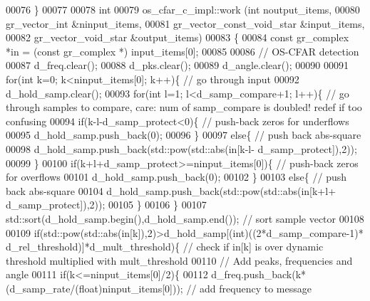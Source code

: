 \begin{DoxyCode}
00076     \}
00077 
00078     \textcolor{keywordtype}{int}
00079     os_cfar_c_impl::work (\textcolor{keywordtype}{int} noutput\_items,
00080                        gr\_vector\_int &ninput\_items,
00081                        gr\_vector\_const\_void\_star &input\_items,
00082                        gr\_vector\_void\_star &output\_items)
00083     \{
00084         \textcolor{keyword}{const} gr\_complex *in = (\textcolor{keyword}{const} gr\_complex *) input\_items[0];
00085         
00086         \textcolor{comment}{// OS-CFAR detection}
00087         d_freq.clear();
00088         d_pks.clear();
00089         d_angle.clear();
00090         
00091         \textcolor{keywordflow}{for}(\textcolor{keywordtype}{int} k=0; k<ninput\_items[0]; k++)\{ \textcolor{comment}{// go through input}
00092             d_hold_samp.clear();
00093             \textcolor{keywordflow}{for}(\textcolor{keywordtype}{int} l=1; l<d_samp_compare+1; l++)\{ \textcolor{comment}{// go through samples to compare, care: num of
       samp\_compare is doubled! redef if too confusing}
00094                 \textcolor{keywordflow}{if}(k-l-d_samp_protect<0)\{ \textcolor{comment}{// push-back zeros for underflows}
00095                     d_hold_samp.push\_back(0);
00096                 \}
00097                 \textcolor{keywordflow}{else}\{ \textcolor{comment}{// push back abs-square}
00098                     d_hold_samp.push\_back(std::pow(std::abs(in[k-l-
      d_samp_protect]),2));
00099                 \}
00100                 \textcolor{keywordflow}{if}(k+l+d_samp_protect>=ninput\_items[0])\{ \textcolor{comment}{// push-back zeros for overflows}
00101                     d_hold_samp.push\_back(0);
00102                 \}
00103                 \textcolor{keywordflow}{else}\{ \textcolor{comment}{// push back abs-square}
00104                     d_hold_samp.push\_back(std::pow(std::abs(in[k+l+
      d_samp_protect]),2));
00105                 \}
00106             \}
00107             std::sort(d_hold_samp.begin(),d_hold_samp.end()); \textcolor{comment}{// sort sample vector}
00108             
00109             \textcolor{keywordflow}{if}(std::pow(std::abs(in[k]),2)>d_hold_samp[(int)((2*d\_samp\_compare-1)*
      d_rel_threshold)]*d_mult_threshold)\{ \textcolor{comment}{// check if in[k] is over dynamic threshold multiplied with
       mult\_threshold}
00110                 \textcolor{comment}{// Add peaks, frequencies and angle}
00111                 \textcolor{keywordflow}{if}(k<=ninput\_items[0]/2)\{
00112                     d_freq.push\_back(k*(d_samp_rate/(\textcolor{keywordtype}{float})ninput\_items[0])); \textcolor{comment}{// add frequency to message
}
\end{DoxyCode}
